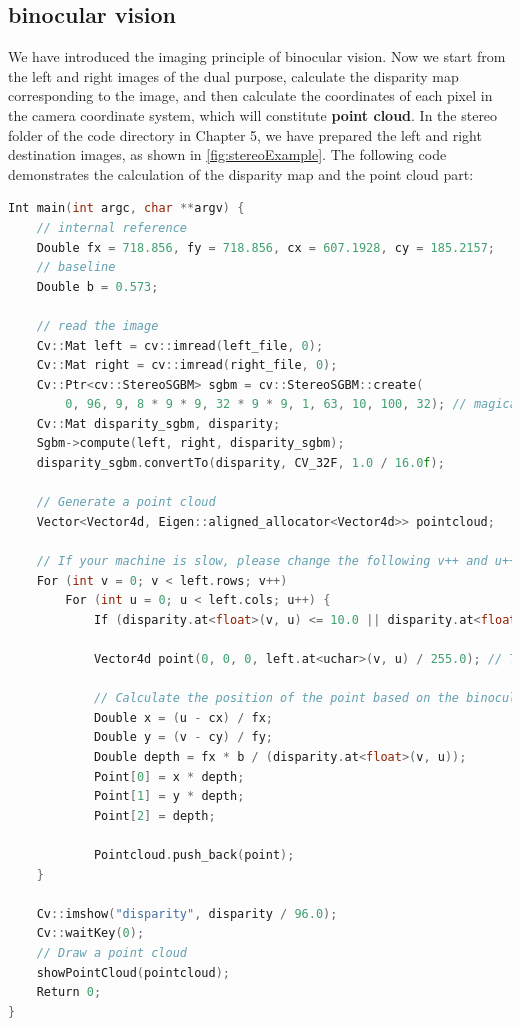 \subsection{binocular vision}

We have introduced the imaging principle of binocular vision. Now we start from the left and right images of the dual purpose, calculate the disparity map corresponding to the image, and then calculate the coordinates of each pixel in the camera coordinate system, which will constitute \textbf{point cloud}. In the stereo folder of the code directory in Chapter 5, we have prepared the left and right destination images, as shown in \autoref{fig:stereoExample}. The following code demonstrates the calculation of the disparity map and the point cloud part:

\begin{lstlisting}[language=C++,caption=slambook/ch5/stereoVision/stereoVision.cpp(part)]
Int main(int argc, char **argv) {
    // internal reference
    Double fx = 718.856, fy = 718.856, cx = 607.1928, cy = 185.2157;
    // baseline
    Double b = 0.573;
    
    // read the image
    Cv::Mat left = cv::imread(left_file, 0);
    Cv::Mat right = cv::imread(right_file, 0);
    Cv::Ptr<cv::StereoSGBM> sgbm = cv::StereoSGBM::create(
        0, 96, 9, 8 * 9 * 9, 32 * 9 * 9, 1, 63, 10, 100, 32); // magical parameters
    Cv::Mat disparity_sgbm, disparity;
    Sgbm->compute(left, right, disparity_sgbm);
    disparity_sgbm.convertTo(disparity, CV_32F, 1.0 / 16.0f);
    
    // Generate a point cloud
    Vector<Vector4d, Eigen::aligned_allocator<Vector4d>> pointcloud;
    
    // If your machine is slow, please change the following v++ and u++ to v+=2, u+=2
    For (int v = 0; v < left.rows; v++)
        For (int u = 0; u < left.cols; u++) {
            If (disparity.at<float>(v, u) <= 10.0 || disparity.at<float>(v, u) >= 96.0) continue;
            
            Vector4d point(0, 0, 0, left.at<uchar>(v, u) / 255.0); // The front three dimensions are xyz and the fourth dimension is color
            
            // Calculate the position of the point based on the binocular model
            Double x = (u - cx) / fx;
            Double y = (v - cy) / fy;
            Double depth = fx * b / (disparity.at<float>(v, u));
            Point[0] = x * depth;
            Point[1] = y * depth;
            Point[2] = depth;
            
            Pointcloud.push_back(point);
    }
    
    Cv::imshow("disparity", disparity / 96.0);
    Cv::waitKey(0);
    // Draw a point cloud
    showPointCloud(pointcloud);
    Return 0;
}
\end{lstlisting}

